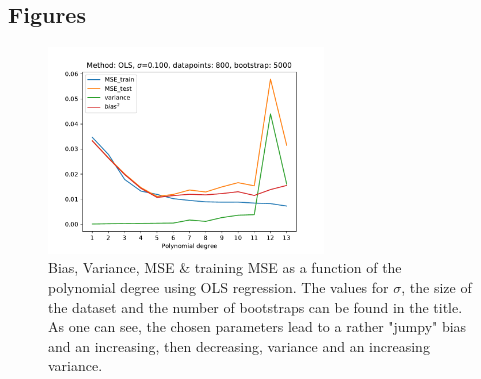 \documentclass[11pt,a4paper,titlepage]{article}
\begin{document}
\subsection{Figures}
\begin{figure}[H]
\centering
\includegraphics[width=0.65\textwidth]{Bias_Variance_OLS_BAD.pdf}
\caption[Bias, Variance, MSE \& training MSE as a function of the polynomial degree using OLS regression - whacky version]{Bias, Variance, MSE \& training MSE as a function of the polynomial degree using OLS regression. The values for $\sigma$, the size of the dataset and the number of bootstraps can be found in the title. As one can see, the chosen parameters lead to a rather "jumpy" bias and an increasing, then decreasing, variance and an increasing variance.}
\label{fig:Bias_Variance_fucked}
\end{figure}


\end{document}
